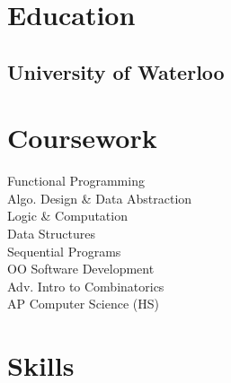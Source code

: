 \documentclass[letterpaper]{deedy-resume} %
\begin{document}
\begin{minipage}[t]{0.33\textwidth} %


  \section{Education} 

  \subsection{University of Waterloo}


  \sectionspace %



  \section{Coursework}

  Functional Programming \\
  Algo. Design \& Data Abstraction \\
  Logic \& Computation \\
  Data Structures \\
  Sequential Programs \\
  OO Software Development \\
  Adv. Intro to Combinatorics \\
  AP Computer Science (HS)

  \sectionspace %


  \section{Skills}

  \vspace{2mm}


\end{minipage}
\end{document}
